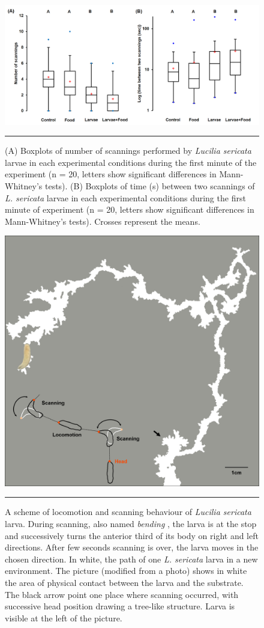 \begin{figure}[ht]
	\centering
		\includegraphics[width=0.9 \textwidth]{Figures/fig4.png}
		\rule{35em}{0.5pt}
	\caption[Boxplot]{(A) Boxplots of number of scannings performed by \textit{Lucilia sericata} larvae in each experimental conditions during the first minute of the experiment (n = 20, letters show significant differences in Mann-Whitney’s tests). (B) Boxplots of time (s) between two scannings of \textit{L. sericata} larvae in each experimental conditions during the first minute of experiment (n = 20, letters show significant differences in Mann-Whitney’s tests). Crosses represent the means.}
	\label{fig:boxplot}
\end{figure}

\begin{figure}[ht]
	\centering
		\includegraphics[width=0.6 \textwidth]{Figures/fig5.png}
		\rule{35em}{0.5pt}
	\caption[Scan]{A scheme of locomotion and scanning behaviour of \textit{Lucilia sericata} larva. During scanning, also named \textit{bending} \cite{green_organization_1983}, the larva is at the stop and successively turns the anterior third of its body on right and left directions. After few seconds scanning is over, the larva moves in the chosen direction. In white, the path of one \textit{L. sericata} larva in a new environment. The picture (modified from a photo) shows in white the area of physical contact between the larva and the substrate. The black arrow point one place where scanning occurred, with successive head position drawing a tree-like structure. Larva is visible at the left of the picture.}
	\label{fig:scan}
\end{figure}             


